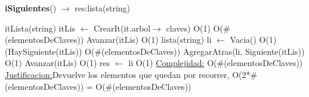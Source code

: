 \begin{Algoritmos}
\begin{algorithm}[H]{\textbf{iSiguientes}() $\to$ res:lista(string)}
	\begin{algorithmic}[1]
		\State itLista(string) itLis $\gets$ CrearIt(it.arbol$\to$ claves) \Comment O(1)
		 \Comment O($\#$(elementosDeClaves))
			\State Avanzar(itLis) \Comment O(1)
		\EndWhile
		\State lista(string) li $\gets$ Vacia() \Comment O(1)
		\While(HaySiguiente(itLis)) \Comment O($\#$(elementosDeClaves))
			\State AgregarAtras(li, Siguiente(itLis)) \Comment O(1)
			\State Avanzar(itLis) \Comment O(1) 		
		\EndWhile
		\State res $\gets$ li \Comment O(1)
		\medskip
		\Statex \underline{Complejidad:} O($\#$(elementosDeClaves))
			\Statex \underline{Justificacion:}Devuelve los elementos que quedan por recorrer, O(2*$\#$(elementosDeClaves)) = O($\#$(elementosDeClaves))
	\end{algorithmic}
\end{algorithm}

\end{Algoritmos}

